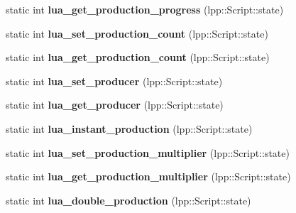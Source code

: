 \begin{DoxyCompactItemize}
\item 
static int {\bfseries lua\+\_\+get\+\_\+production\+\_\+progress} (lpp\+::\+Script\+::state)\hypertarget{class_lua_interface_aa7a3b3c7eed4438647000bf4e9a74c5e}{}\label{class_lua_interface_aa7a3b3c7eed4438647000bf4e9a74c5e}

\item 
static int {\bfseries lua\+\_\+set\+\_\+production\+\_\+count} (lpp\+::\+Script\+::state)\hypertarget{class_lua_interface_a4d2bbb7da495d23f606e875f38920d69}{}\label{class_lua_interface_a4d2bbb7da495d23f606e875f38920d69}

\item 
static int {\bfseries lua\+\_\+get\+\_\+production\+\_\+count} (lpp\+::\+Script\+::state)\hypertarget{class_lua_interface_af0a6c2e14e82c46763fc60a4c4fdce4d}{}\label{class_lua_interface_af0a6c2e14e82c46763fc60a4c4fdce4d}

\item 
static int {\bfseries lua\+\_\+set\+\_\+producer} (lpp\+::\+Script\+::state)\hypertarget{class_lua_interface_a842a0f5701b234fa7c60e0e5546c47c9}{}\label{class_lua_interface_a842a0f5701b234fa7c60e0e5546c47c9}

\item 
static int {\bfseries lua\+\_\+get\+\_\+producer} (lpp\+::\+Script\+::state)\hypertarget{class_lua_interface_a356f0e4722e8fecf9155cc9eec47f6eb}{}\label{class_lua_interface_a356f0e4722e8fecf9155cc9eec47f6eb}

\item 
static int {\bfseries lua\+\_\+instant\+\_\+production} (lpp\+::\+Script\+::state)\hypertarget{class_lua_interface_a148bc954dff85a1ca3e365858a9b2173}{}\label{class_lua_interface_a148bc954dff85a1ca3e365858a9b2173}

\item 
static int {\bfseries lua\+\_\+set\+\_\+production\+\_\+multiplier} (lpp\+::\+Script\+::state)\hypertarget{class_lua_interface_a4bc37a2834832ec288a0e08b2faac376}{}\label{class_lua_interface_a4bc37a2834832ec288a0e08b2faac376}

\item 
static int {\bfseries lua\+\_\+get\+\_\+production\+\_\+multiplier} (lpp\+::\+Script\+::state)\hypertarget{class_lua_interface_a2833f134243f47e33bab8c2aaef7d32c}{}\label{class_lua_interface_a2833f134243f47e33bab8c2aaef7d32c}

\item 
static int {\bfseries lua\+\_\+double\+\_\+production} (lpp\+::\+Script\+::state)\hypertarget{class_lua_interface_a3bc07e0e4fed946358f9536b44577831}{}\label{class_lua_interface_a3bc07e0e4fed946358f9536b44577831}


\end{DoxyCompactItemize}
